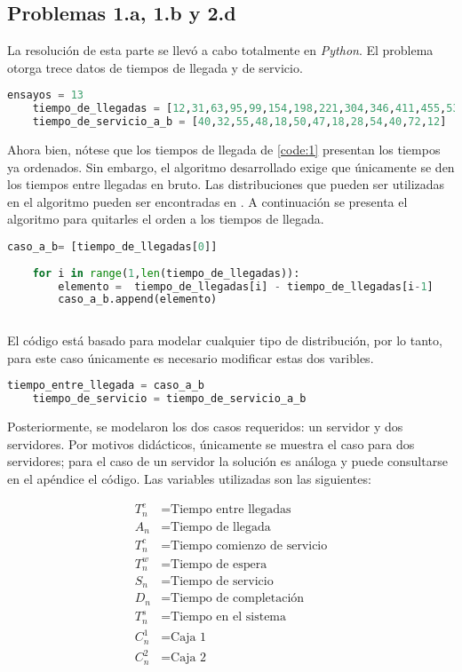 \documentclass[journal]{IEEEtran}
\begin{document}
\subsection{Problemas 1.a, 1.b y 2.d}
La resolución de esta parte se llevó a cabo totalmente en \textit{Python}. El problema otorga trece datos de tiempos de llegada y de servicio. 


\begin{lstlisting}[language=Python, label={code:1}, caption=Tiempos de llegada y de servicio.]
	ensayos = 13
	tiempo_de_llegadas = [12,31,63,95,99,154,198,221,304,346,411,455,537]
	tiempo_de_servicio_a_b = [40,32,55,48,18,50,47,18,28,54,40,72,12]
\end{lstlisting}

Ahora bien, nótese que los tiempos de llegada de \cref{code:1} presentan los tiempos ya ordenados. Sin embargo, el algoritmo desarrollado exige que únicamente se den los tiempos entre llegadas en bruto. Las distribuciones que pueden ser utilizadas en el algoritmo pueden ser encontradas en \cite{wackerly2014mathematical}. A continuación se presenta el algoritmo para quitarles el orden a los tiempos de llegada. 
\begin{lstlisting}[language=Python,label={code:2}, caption=Casos tiempos de llegada]
	caso_a_b= [tiempo_de_llegadas[0]]
	
	for i in range(1,len(tiempo_de_llegadas)):
		elemento =  tiempo_de_llegadas[i] - tiempo_de_llegadas[i-1] 
		caso_a_b.append(elemento)
	
\end{lstlisting}

El código está basado para modelar cualquier tipo de distribución, por lo tanto, para este caso únicamente es necesario modificar estas dos varibles. 
\begin{lstlisting}[language=Python, label={code:3}, caption=Caso a y Caso b]
	tiempo_entre_llegada = caso_a_b
	tiempo_de_servicio = tiempo_de_servicio_a_b 
\end{lstlisting}

Posteriormente, se modelaron los dos casos requeridos: un servidor y dos servidores. Por motivos didácticos, únicamente se muestra el caso para dos servidores; para el caso de un servidor la solución es análoga y puede consultarse en el apéndice el código.  Las variables utilizadas son las siguientes: 

\begin{align*}
	T^e_n &= \text{Tiempo entre llegadas}\\
	A_n &= \text{Tiempo de llegada}\\
	T^c_n &= \text{Tiempo comienzo de servicio}\\
	T^w_n &= \text{Tiempo de espera}\\
	S_n &= \text{Tiempo de servicio}\\
	D_n &= \text{Tiempo de completación}\\
	T^s_n &= \text{Tiempo en el sistema}\\
	C^1_n &= \text{Caja 1}\\
	C^2_n &= \text{Caja 2}
\end{align*}
\end{document}
